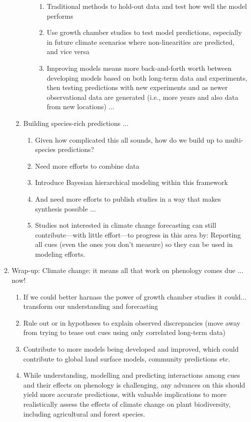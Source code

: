 \documentclass[11pt,letterpaper]{article}
\begin{document}
\begin{enumerate}
\begin{enumerate}
\begin{enumerate}
\begin{enumerate}
\item Traditional methods to hold-out data and test how well the model performs
\item Use growth chamber studies to test model predictions, especially in future climate scenarios where non-linearities are predicted, and vice versa \citep[see][]{nagano2012}
\item Improving models means more back-and-forth worth between developing models based on both long-term data and experiments, then testing predictions with new experiments and as newer observational data are generated (i.e., more years and also data from new locations) ... \citep{nagano2012,satake2013}
\end{enumerate}
\end{enumerate}
\item Building species-rich predictions ... 
\begin{enumerate}
\item Given how complicated this all sounds, how do we build up to multi-species predictions?
\item Need more efforts to combine data
\item Introduce Bayesian hierarchical modeling within this framework
\item And need more efforts to publish studies in a way that makes synthesis possible ...
\item Studies not interested in climate change forecasting can still contribute---with little effort---to progress in this area by: Reporting all cues (even the ones you don't measure) so they can be used in modeling efforts. 
\end{enumerate}
\end{enumerate}
\item Wrap-up: Climate change: it means all that work on phenology comes due ... now!
\begin{enumerate}
\item If we could better harnass the power of growth chamber studies it could... transform our understanding and forecasting
\item Rule out or in hypotheses to explain observed discrepancies (move away from trying to tease out cues using only correlated long-term data)
\item Contribute to more models being developed and improved, which could contribute to global land surface models, community predictions etc. 
\item While understanding, modelling and predicting interactions among cues and their effects on phenology is challenging, any advances on this should yield more accurate predictions, with valuable implications to more realistically assess the effects of climate change on plant biodiversity, including agricultural and forest species. %
\end{enumerate}
\end{enumerate}
\end{document}
